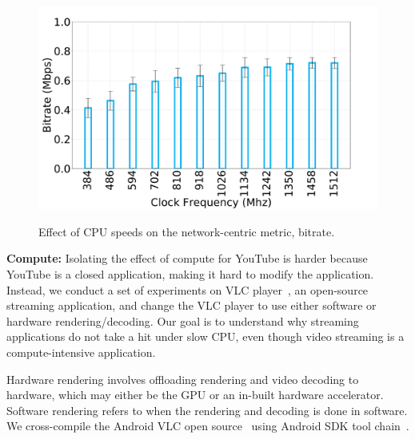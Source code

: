 \begin{figure}
\begin{minipage}[t]{.33\textwidth}
   \includegraphics[width=\linewidth]{sections/device-work/skype-bitrate.pdf}
   \caption{Effect of CPU speeds on the network-centric metric, bitrate.} 
   \vspace{-0.2in}
   \label{fig:skype-bitrate}
   \end{minipage}
\end{figure}

\noindent \textbf{Compute:} Isolating the effect of compute for YouTube is harder because YouTube is a closed application, making it hard to modify the application. Instead, we conduct a set of experiments on VLC player~\cite{andriodvlc}, an open-source streaming application, and change the VLC player to use either software or hardware rendering/decoding. Our goal is to understand why streaming applications do not take a hit under slow CPU, even though video streaming is a compute-intensive application.  

Hardware rendering involves offloading rendering and video decoding to hardware, which may either be the GPU or an in-built hardware accelerator. Software rendering refers to when the rendering and decoding is done in software.
We cross-compile the Android VLC open source~\cite{andriodvlc} using Android SDK tool chain~\cite{andriodsdk}. 


